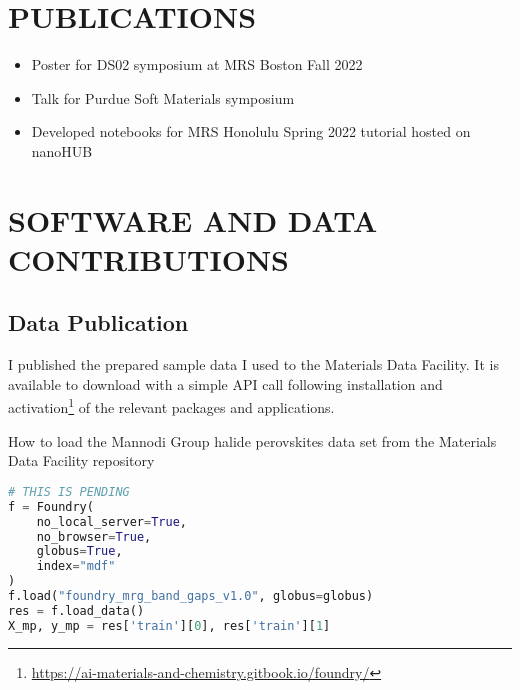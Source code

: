 \chapter{PUBLICATIONS}
\label{sec:orgcd78d4b}

\nocite{manganaris-2022-mrs-comput}
\nocite{yang-2023-high-throug}
\nocite{manganaris-2023-multi-fidel}
\nocite{gollapalli-2023-graph-neural}
\nocite{edlabadkar-2023-drivin-halid}
\nocite{yang-2023-discov-novel}

\printbibliography[heading=none,category=myarticles]

\begin{itemize}
\item Poster for DS02 symposium at MRS Boston Fall 2022
\autocite{2022-novel-halid}
\item Talk for Purdue Soft Materials symposium
\autocite{2022-machin-learn}
\item Developed notebooks for MRS Honolulu Spring 2022 tutorial hosted on nanoHUB
\autocite{manganaris-2022-mrs-comput}
\end{itemize}

\chapter{SOFTWARE AND DATA CONTRIBUTIONS}
\label{sec:orga3ae64f}
\section{Data Publication}
\label{sec:org052c030}
I published the prepared sample data I used to the Materials Data Facility.
It is available to download with a simple API call following installation and activation\footnote{\url{https://ai-materials-and-chemistry.gitbook.io/foundry/}} of the relevant packages and applications.

\begin{ZZlisting}
  \caption{\label{lst:MDF} How to load the Mannodi Group halide perovskites data set from the Materials Data Facility repository}
  \begin{CenteredBox}
    \begin{lstlisting}[language=python]
# THIS IS PENDING
f = Foundry(
    no_local_server=True,
    no_browser=True,
    globus=True,
    index="mdf"
)
f.load("foundry_mrg_band_gaps_v1.0", globus=globus)
res = f.load_data()
X_mp, y_mp = res['train'][0], res['train'][1]
    \end{lstlisting}
  \end{CenteredBox}
\end{ZZlisting}

